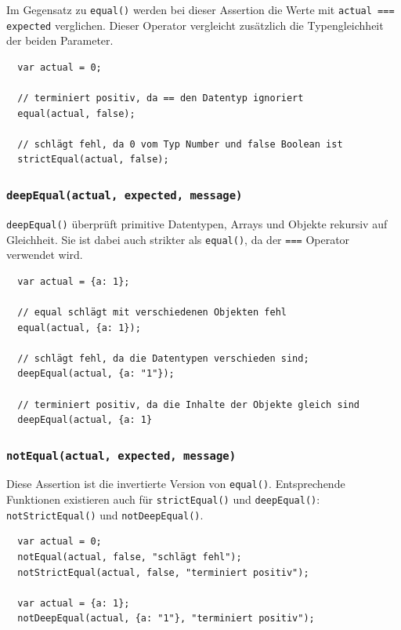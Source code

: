 \documentclass[11pt, a4paper]{article}
\begin{document}
Im Gegensatz zu \texttt{equal()} werden bei dieser Assertion die Werte
mit \texttt{actual === expected} verglichen. Dieser Operator vergleicht
zusätzlich die Typengleichheit der beiden Parameter.

\begin{verbatim}
  var actual = 0;

  // terminiert positiv, da == den Datentyp ignoriert
  equal(actual, false);

  // schlägt fehl, da 0 vom Typ Number und false Boolean ist
  strictEqual(actual, false);
\end{verbatim}

\subsubsection*{\texttt{deepEqual(actual, expected, message)}}

\texttt{deepEqual()} überprüft primitive Datentypen, Arrays und Objekte
rekursiv auf Gleichheit. Sie ist dabei auch strikter als \texttt{equal()}, da
der \texttt{===} Operator verwendet wird.

\begin{verbatim}
  var actual = {a: 1};

  // equal schlägt mit verschiedenen Objekten fehl
  equal(actual, {a: 1});

  // schlägt fehl, da die Datentypen verschieden sind;
  deepEqual(actual, {a: "1"});

  // terminiert positiv, da die Inhalte der Objekte gleich sind
  deepEqual(actual, {a: 1}
\end{verbatim}

\subsubsection*{\texttt{notEqual(actual, expected, message)}}

Diese Assertion ist die invertierte Version von \texttt{equal()}.
Entsprechende Funktionen existieren auch für \texttt{strictEqual()} und
\texttt{deepEqual()}: \texttt{notStrictEqual()} und \texttt{notDeepEqual()}.

\begin{verbatim}
  var actual = 0;
  notEqual(actual, false, "schlägt fehl");
  notStrictEqual(actual, false, "terminiert positiv");

  var actual = {a: 1};
  notDeepEqual(actual, {a: "1"}, "terminiert positiv");
\end{verbatim}
\end{document}
